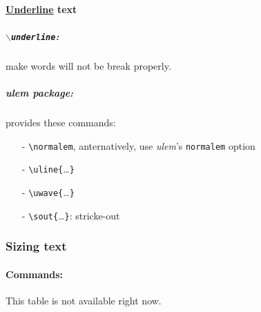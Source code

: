 \documentclass[11pt,a4paper]{article}
\begin{document}
\paragraph{\underline{Underline} text}
\subparagraph{\texttt{$\backslash$underline}:} make words will not be break properly.
\subparagraph{\emph{ulem} package:} provides these commands:
\begin{itemize}
	\item[-] \verb|\normalem|, anternatively, use \emph{ulem}'s \texttt{normalem} option
	\item[-] \verb|\uline{|\ldots\verb|}|
	\item[-] \verb|\uwave{|\ldots\verb|}|
	\item[-] \verb|\sout{|\ldots\verb|}|: stricke-out
\end{itemize}


\subsubsection{Sizing text}

\paragraph{Commands:} This table is not available right now.
\end{document}
